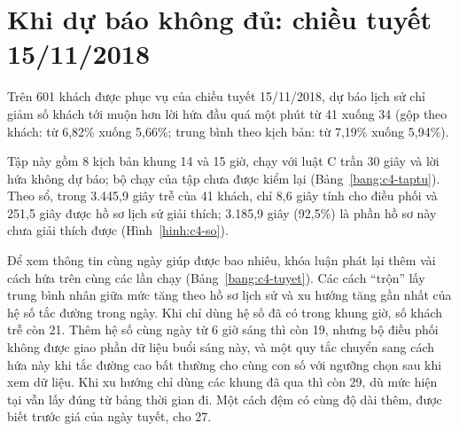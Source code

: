 \section{Khi dự báo không đủ: chiều tuyết 15/11/2018}
\label{muc:c4-tuyet}

Trên 601 khách được phục vụ của chiều tuyết 15/11/2018, dự báo lịch sử chỉ giảm số khách tới muộn hơn lời hứa đầu
quá một phút từ 41 xuống 34 (gộp theo khách: từ 6,82\% xuống 5,66\%; trung bình theo kịch bản: từ 7,19\% xuống
5,94\%).

Tập này gồm 8 kịch bản khung 14 và 15 giờ, chạy với luật C trần 30 giây và lời hứa không dự báo; bộ chạy của tập
chưa được kiểm lại (Bảng~\ref{bang:c4-taptu}). Theo sổ, trong 3.445,9 giây trễ của 41 khách, chỉ 8,6 giây tính cho
điều phối và 251,5 giây được hồ sơ lịch sử giải thích; 3.185,9 giây (92,5\%) là phần hồ sơ này chưa giải thích được
(Hình~\ref{hinh:c4-so}).

Để xem thông tin cùng ngày giúp được bao nhiêu, khóa luận phát lại thêm vài cách hứa trên cùng các lần chạy
(Bảng~\ref{bang:c4-tuyet}). Các cách ``trộn'' lấy trung bình nhân giữa mức tăng theo hồ sơ lịch sử và xu hướng tăng
gần nhất của hệ số tắc đường trong ngày. Khi chỉ dùng hệ số đã có trong khung giờ, số khách trễ còn 21. Thêm hệ số
cùng ngày từ 6 giờ sáng thì còn 19, nhưng bộ điều phối không được giao phần dữ liệu buổi sáng này, và một quy tắc
chuyển sang cách hứa này khi tắc đường cao bất thường cho cùng con số với ngưỡng chọn sau khi xem dữ liệu. Khi xu
hướng chỉ dùng các khung đã qua thì còn 29, dù mức hiện tại vẫn lấy đúng từ bảng thời gian đi. Một cách đệm có cùng
độ dài thêm, được biết trước giá của ngày tuyết, cho 27.

